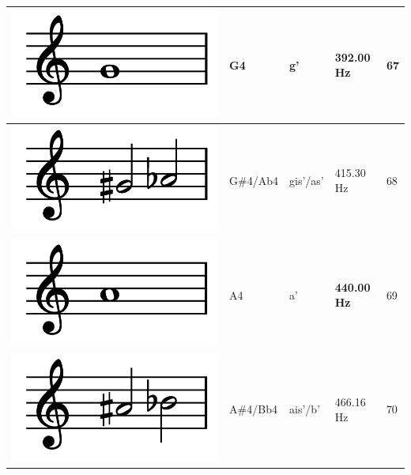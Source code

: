 \documentclass[a4paper, 11pt, twoside]{report}
\theoremstyle{definition}
\begin{document}
\begin{longtable}{ | M{3.5cm} | M{2.8cm} | M{2.8cm} | M{2.5cm} | M{2.2cm} | }
    \includegraphics[width=0.85\linewidth]{assets/notes/G4.png}  & G4                      & g'                     & 392.00 Hz          & 67               \\ \hline
    \includegraphics[width=0.85\linewidth]{assets/notes/GS4.png} & G\#4/Ab4                & gis'/as'               & 415.30 Hz          & 68               \\ \hline
    \includegraphics[width=0.85\linewidth]{assets/notes/A4.png}  & A4                      & a'                     & \textbf{440.00 Hz} & 69               \\ \hline
    \includegraphics[width=0.85\linewidth]{assets/notes/AS4.png} & A\#4/Bb4                & ais'/b'                & 466.16 Hz          & 70               \\ \hline

\end{longtable}
\end{document}
